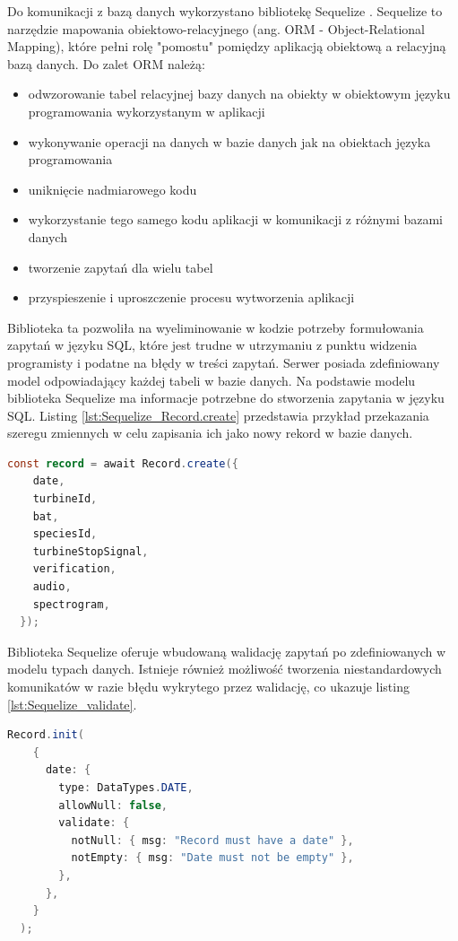 \documentclass{sprz}
\begin{document}
Do komunikacji z bazą danych wykorzystano bibliotekę Sequelize \cite{sequelize}. Sequelize to narzędzie mapowania obiektowo-relacyjnego (ang. ORM - Object-Relational Mapping), które pełni rolę "pomostu" pomiędzy aplikacją obiektową a relacyjną bazą danych.
Do zalet ORM należą:
\begin{itemize}
  \item odwzorowanie tabel relacyjnej bazy danych na obiekty w obiektowym języku programowania wykorzystanym w aplikacji
  \item wykonywanie operacji na danych w bazie danych jak na obiektach języka programowania
  \item uniknięcie nadmiarowego kodu
  \item wykorzystanie tego samego kodu aplikacji w komunikacji z różnymi bazami danych
  \item tworzenie zapytań dla wielu tabel
  \item przyspieszenie i uproszczenie procesu wytworzenia aplikacji
\end{itemize}

Biblioteka ta pozwoliła na wyeliminowanie w kodzie potrzeby formułowania zapytań w języku SQL, które jest trudne w utrzymaniu z punktu widzenia programisty i podatne na błędy w treści zapytań. Serwer posiada zdefiniowany model odpowiadający każdej tabeli w bazie danych. Na podstawie modelu biblioteka Sequelize ma informacje potrzebne do stworzenia zapytania w języku SQL. Listing \ref{lst:Sequelize_Record.create} przedstawia przykład przekazania szeregu zmiennych w celu zapisania ich jako nowy rekord w bazie danych.

\begin{lstlisting}[language=Java,caption={Przykład tworzenia rekordu z pomocą biblioteki Sequelize}, label={lst:Sequelize_Record.create}]
  const record = await Record.create({
    date,
    turbineId,
    bat,
    speciesId,
    turbineStopSignal,
    verification,
    audio,
    spectrogram,
  });
\end{lstlisting}

Biblioteka Sequelize oferuje wbudowaną walidację zapytań po zdefiniowanych w modelu typach danych. Istnieje również możliwość tworzenia niestandardowych komunikatów w razie błędu wykrytego przez walidację, co ukazuje listing \ref{lst:Sequelize_validate}.

\begin{lstlisting}[language=Java,caption={Przykład niestandardowego komunikatu walidacji}, label={lst:Sequelize_validate}]
  Record.init(
    {
      date: {
        type: DataTypes.DATE,
        allowNull: false,
        validate: {
          notNull: { msg: "Record must have a date" },
          notEmpty: { msg: "Date must not be empty" },
        },
      },
    }
  );
\end{lstlisting}
\end{document}
